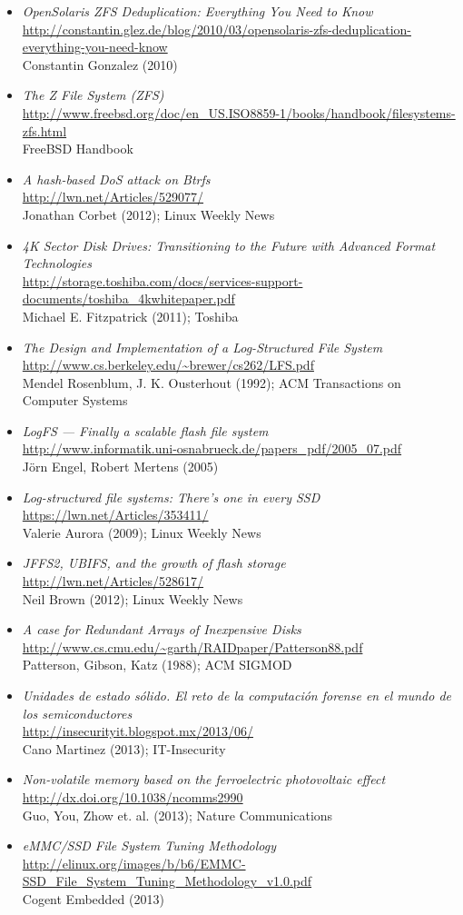 \documentclass[11pt,fleqn]{book} %
\newcommand{\otrorec}[1]{ \\ {\small \url{#1}} \\ }
\begin{document}
\begin{itemize}
\item \emph{OpenSolaris ZFS Deduplication: Everything You Need to Know}
  \otrorec{http://constantin.glez.de/blog/2010/03/opensolaris-zfs-deduplication-everything-you-need-know}
  Constantin Gonzalez (2010)
\item \emph{The Z File System (ZFS)}
  \otrorec{http://www.freebsd.org/doc/en_US.ISO8859-1/books/handbook/filesystems-zfs.html}
  FreeBSD Handbook
\item \emph{A hash-based DoS attack on Btrfs}
  \otrorec{http://lwn.net/Articles/529077/}
  Jonathan Corbet (2012); Linux Weekly News
\item \emph{4K Sector Disk Drives: Transitioning to the Future with Advanced   Format Technologies}
  \otrorec{http://storage.toshiba.com/docs/services-support-documents/toshiba_4kwhitepaper.pdf}
  Michael E. Fitzpatrick (2011); Toshiba
\item \emph{The Design and Implementation of a Log-Structured File System}
  \otrorec{http://www.cs.berkeley.edu/~brewer/cs262/LFS.pdf}
  Mendel Rosenblum, J. K. Ousterhout (1992); ACM Transactions on
  Computer Systems
\item \emph{LogFS — Finally a scalable flash file system}
  \otrorec{http://www.informatik.uni-osnabrueck.de/papers_pdf/2005_07.pdf}
  Jörn Engel, Robert Mertens (2005)
\item \emph{Log-structured file systems: There's one in every SSD}
  \otrorec{https://lwn.net/Articles/353411/}
  Valerie Aurora (2009); Linux Weekly News
\item \emph{JFFS2, UBIFS, and the growth of flash storage}
  \otrorec{http://lwn.net/Articles/528617/}
  Neil Brown (2012); Linux Weekly News
\item \emph{A case for Redundant Arrays of Inexpensive Disks}
  \otrorec{http://www.cs.cmu.edu/~garth/RAIDpaper/Patterson88.pdf}
  Patterson, Gibson, Katz (1988); ACM SIGMOD
\item \emph{Unidades de estado sólido. El reto de la computación forense en el   mundo de los semiconductores}
  \otrorec{http://insecurityit.blogspot.mx/2013/06/}
  Cano Martinez (2013); IT-Insecurity
\item \emph{Non-volatile memory based on the ferroelectric photovoltaic effect}
  \otrorec{http://dx.doi.org/10.1038/ncomms2990}
  Guo, You, Zhow et. al. (2013); Nature Communications
\item \emph{eMMC/SSD File System Tuning Methodology}
  \otrorec{http://elinux.org/images/b/b6/EMMC-SSD_File_System_Tuning_Methodology_v1.0.pdf}
  Cogent Embedded (2013)
\end{itemize}

\listoffigures

\newpage
\pagestyle{empty}


\end{document}

